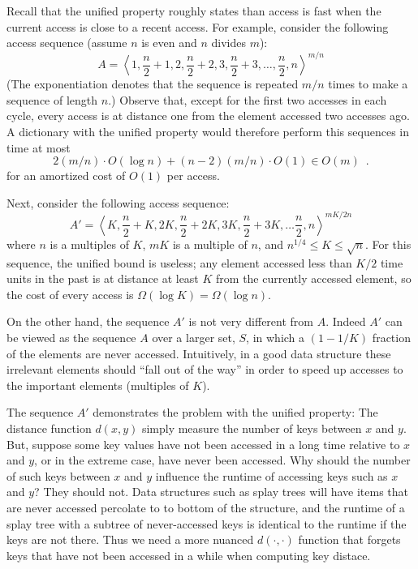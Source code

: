 \documentclass{llncs}
\begin{document}
Recall that the unified property roughly states than access is fast when the current access is close to a recent access. For example, consider the following access sequence (assume $n$ is even and $n$ divides $m$): %
\begin{equation}
	A = \left\langle 1, \frac{n}{2}+1, 2, \frac{n}{2}+2, 3, \frac{n}{2}+3, \ldots, \frac{n}{2}, n \right\rangle^{m/n} \label{eq:bear}
\end{equation}
(The exponentiation denotes that the sequence is repeated $m/n$ times
to make a sequence of length $n$.)
Observe that, except for the first two accesses in each cycle, every access is at distance one from the element accessed two accesses ago.  A dictionary with the unified
property would therefore perform this sequences in time at most
\[
   2(m/n)\cdot O(\log n) + (n-2)(m/n)\cdot O(1) \in O(m) \enspace .
\]
for an amortized cost of $O(1)$ per access.  

Next, consider the following access sequence:
\begin{equation}
	A' = \left\langle K, \frac{n}{2}+K, 2K, \frac{n}{2}+2K, 3K, \frac{n}{2}+3K, \ldots \frac{n}{2},n\right\rangle^{mK/2n}
\end{equation}
where $n$ is a multiples of $K$, $mK$ is a multiple of $n$, and $n^{1/4}\le K\le\sqrt{n}$. For this sequence, the unified bound is useless; any element accessed less than $K/2$ time units in the past is at distance at least $K$ from the currently accessed element, so the cost of every access is $\Omega(\log K) = \Omega(\log n)$.

On the other hand, the sequence $A'$ is not very different from $A$.  Indeed $A'$ can be viewed as the sequence $A$ over a larger set, $S$, in which a $(1-1/K)$ fraction of the elements are never accessed.  Intuitively, in a good data structure these irrelevant elements should ``fall out of the way'' in order to speed up accesses to the important elements (multiples of $K$).


The sequence $A'$ demonstrates the problem with the unified property: The distance function $d(x,y)$ simply measure the number of keys between $x$ and $y$. But, suppose some key values have not been accessed in a long time relative to $x$ and $y$, or in the extreme case, have never been accessed. Why should the number of such keys between $x$ and $y$ influence the runtime of accessing keys such as $x$ and $y$?
They should not. Data structures such as splay trees will have items that are never accessed percolate to to bottom of the structure, and the runtime of a splay tree with a subtree of never-accessed keys is identical to the runtime if the keys are not there. Thus we need a more nuanced $d(\cdot,\cdot)$ function that forgets keys that have not been accessed in a while when computing key distace.
\end{document}
